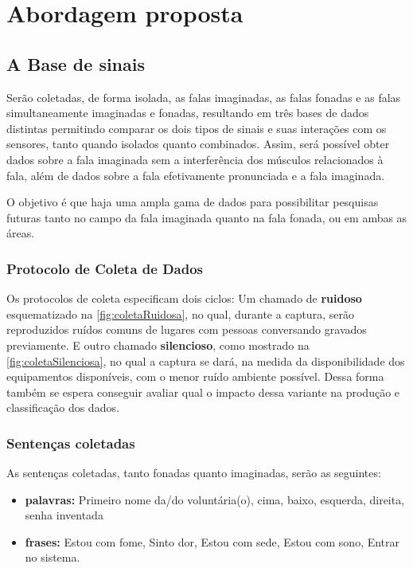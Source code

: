 \chapter{Abordagem proposta} \label{chap:propApproach}
	\section{A Base de sinais}
		\par Serão coletadas, de forma isolada, as falas imaginadas, as falas fonadas e as falas simultaneamente imaginadas e fonadas, resultando em três bases de dados distintas permitindo comparar os dois tipos de sinais e suas interações com os sensores, tanto quando isolados quanto combinados. Assim, será possível obter dados sobre a fala imaginada sem a interferência dos músculos relacionados à fala, além de dados sobre a fala efetivamente pronunciada e a fala imaginada.
		
		\par O objetivo é que haja uma ampla gama de dados para possibilitar pesquisas futuras tanto no campo da fala imaginada quanto na fala fonada, ou em ambas as áreas.
		
	    \subsection{Protocolo de Coleta de Dados}
		    
		    \par Os protocolos de coleta especificam dois ciclos: Um chamado de \textbf{ruidoso} esquematizado na \autoref{fig:coletaRuidosa}, no qual, durante a captura, serão reproduzidos ruídos comuns de lugares com pessoas conversando gravados previamente. E outro chamado \textbf{silencioso}, como mostrado na \autoref{fig:coletaSilenciosa}, no qual a captura se dará, na medida da disponibilidade dos equipamentos disponíveis, com o menor ruído ambiente possível. Dessa forma também se espera conseguir avaliar qual o impacto dessa variante na produção e classificação dos dados.
		    
		    \subsection{Sentenças coletadas}
		    
			    \par As sentenças coletadas, tanto fonadas quanto imaginadas, serão as seguintes:
			    \begin{itemize}
			    	\item \textbf{palavras:} Primeiro nome da/do voluntária(o), cima, baixo, esquerda, direita, senha inventada
			    	\item \textbf{frases:} Estou com fome, Sinto dor, Estou com sede, Estou com sono, Entrar no sistema.
			    \end{itemize}
			    
